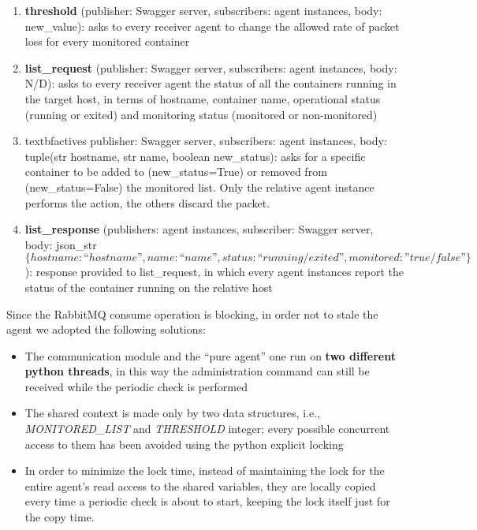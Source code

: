 \begin{enumerate}
	\item \textbf{threshold} (publisher: Swagger server, subscribers: agent instances, body: new\_value): asks to every receiver agent to change the allowed rate of packet loss for every monitored container
	\item \textbf{list\_request} (publisher: Swagger server, subscribers: agent instances, body: N/D): asks to every receiver agent the status of all the containers running in the target host, in terms of hostname, container name, operational status (running or exited) and monitoring status (monitored or non-monitored)
	\item textbf{actives} publisher: Swagger server, subscribers: agent instances, body: tuple(str hostname, str name, boolean new\_status): asks for a specific container to be added to (new\_status=True) or removed from (new\_status=False) the monitored list. Only the relative agent instance performs the action, the others discard the packet.
	\item \textbf{list\_response} (publishers: agent instances, subscriber: Swagger server, body: json\_str \textit{\[\{hostname: “hostname”, name: “name”, status: “running/exited”, monitored: ”true/false”\}\]}): response provided to list\_request, in which every agent instances report the status of the container running on the relative host
\end{enumerate}

Since the RabbitMQ consume operation is blocking, in order not to stale the agent we adopted the following solutions:
\begin{itemize}
	\item The communication module and the “pure agent” one run on \textbf{two different python threads}, in this way the administration command can still be received while the periodic check is performed
	\item The shared context is made only by two data structures, i.e.,  \textit{MONITORED\_LIST} and \textit{THRESHOLD} integer; every possible concurrent access to them has been avoided using the python explicit locking
	\item In order to minimize the lock time, instead of maintaining the lock for the entire agent’s read access to the shared variables, they are locally copied every time a periodic check is about to start, keeping the lock itself just for the copy time.
\end{itemize}

